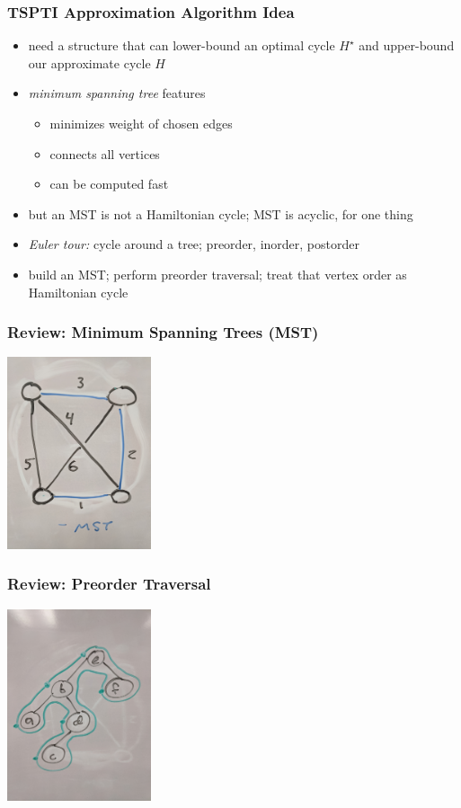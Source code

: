 \documentclass{beamer}
\begin{document}
  \begin{frame} \frametitle{TSPTI Approximation Algorithm Idea}
  \begin{itemize}
    \item need a structure that can lower-bound an optimal cycle $H^\star$ and upper-bound
      our approximate cycle $H$
    \item \emph{minimum spanning tree} features
    \begin{itemize}
      \item minimizes weight of chosen edges
      \item connects all vertices
      \item can be computed fast
    \end{itemize}
    \item but an MST is not a Hamiltonian cycle; MST is acyclic, for one thing
    \item \emph{Euler tour:} cycle around a tree; preorder, inorder, postorder
    \item build an MST; perform preorder traversal; treat that vertex order as Hamiltonian cycle
  \end{itemize}
  \end{frame}
  
  \begin{frame} \frametitle{Review: Minimum Spanning Trees (MST)}
    \begin{center}
      \includegraphics[height=160pt]{13-mst.jpg}
    \end{center}
  \end{frame}
  
  \begin{frame} \frametitle{Review: Preorder Traversal}
    \begin{center}
      \includegraphics[height=160pt]{13-preorder.jpg}
    \end{center}
  \end{frame}
  
\end{document}
